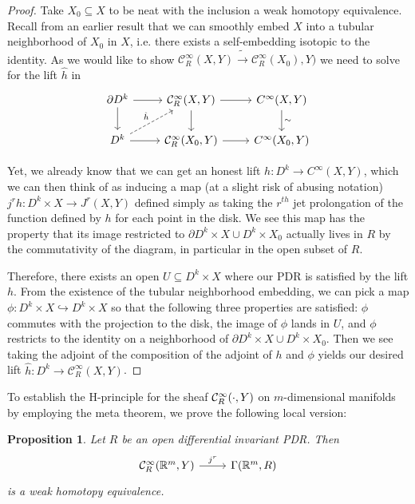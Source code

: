 \documentclass{article}
\newtheorem{proposition}[theorem]{Proposition}
\newtheorem{proposed work}[theorem]{Proposed Work}
\begin{document}
\begin{proof}
Take $X_0 \subseteq X$ to be neat with the inclusion a weak homotopy equivalence. Recall from an earlier result that we can smoothly embed $X$ into a tubular neighborhood of $X_0$ in $X$, i.e. there exists a self-embedding isotopic to the identity. As we would like to show
$\mathcal{C}^\infty_R(X,Y) \tilde{\to} \mathcal{C}^\infty_R(X_0),Y)$
we need to solve for the lift $\hat{h}$ in
\[
\begin{tikzcd}
\partial D^k \ar[r] \ar[d] & \mathcal{C}^\infty_R(X,Y) \ar[r] \ar[d] & C^\infty(X,Y) \ar[d,"\sim"] \\
D^k  \ar[r] \ar[ur,dashed,"\hat{h}"] & \mathcal{C}^\infty_R(X_0,Y) \ar[r] & C^\infty(X_0,Y)
\end{tikzcd}
\]

Yet, we already know that we can get an honest lift $h:D^k \to C^\infty(X,Y)$, which we can then think of as inducing a map (at a slight risk of abusing notation) $j^rh:D^k \times X \to J^r(X,Y)$ defined simply as taking the $r^{th}$ jet prolongation of the function defined by $h$ for each point in the disk. We see this map has the property that its image restricted to $\partial D^k \times X \cup D^k \times X_0$ actually lives in $R$ by the commutativity of the diagram, in particular in the open subset of $R$.

Therefore, there exists an open $U \subseteq D^k \times X$ where our PDR is satisfied by the lift $h$. From the existence of the tubular neighborhood embedding, we can pick a map $\phi: D^k \times X \hookrightarrow D^k \times X$ so that the following three properties are satisfied: $\phi$ commutes with the projection to the disk, the image of $\phi$ lands in $U$, and $\phi$ restricts to the identity on a neighborhood of $\partial D^k \times X \cup D^k \times X_0$. Then we see taking the adjoint of the composition of the adjoint of $h$ and $\phi$ yields our desired lift $\hat{h}:D^k \to \mathcal{C}^\infty_R(X,Y)$.
\end{proof}



To establish the H-principle for the sheaf $\mathcal C^\infty_R(\cdot,Y)$ on
$m$-dimensional manifolds by employing the meta theorem, we prove the
following local version:
\begin{proposition}\label{RdiffInvHtpyeq}
Let $R$ be an open differential invariant PDR. Then
\begin{equation*}
\begin{tikzcd}
\cC^\infty_R(\R^m,Y) \ar[r, "j^r"] & \Gamma(\R^m, R)
\end{tikzcd}
\end{equation*}
is a weak homotopy equivalence.
\end{proposition}
\end{document}

